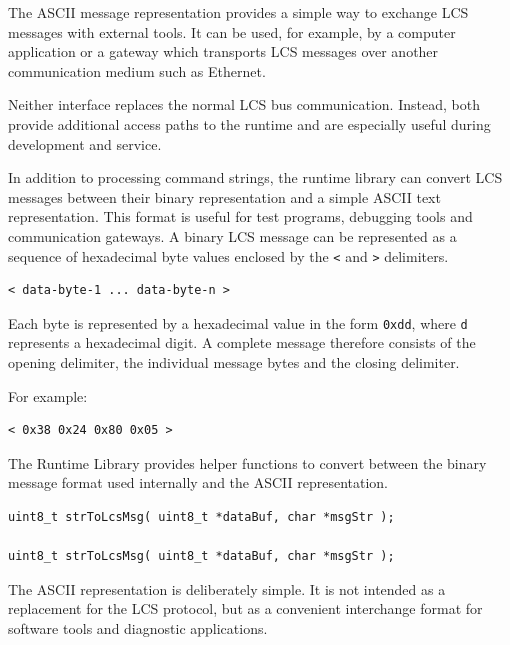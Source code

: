 The ASCII message representation provides a simple way to exchange LCS messages with
external tools. It can be used, for example, by a computer application or a gateway
which transports LCS messages over another communication medium such as Ethernet.

Neither interface replaces the normal LCS bus communication. Instead, both provide
additional access paths to the runtime and are especially useful during development and
service.



In addition to processing command strings, the runtime library can convert LCS messages
between their binary representation and a simple ASCII text representation.
This format is useful for test programs, debugging tools and communication gateways.
A binary LCS message can be represented as a sequence of hexadecimal byte values
enclosed by the \texttt{<} and \texttt{>} delimiters.

\lstset{style=codesnippet-nobox}
\begin{lstlisting}
< data-byte-1 ... data-byte-n >
\end{lstlisting}

Each byte is represented by a hexadecimal value in the form \texttt{0xdd}, where
\texttt{d} represents a hexadecimal digit. A complete message therefore consists of
the opening delimiter, the individual message bytes and the closing delimiter.

For example:

\lstset{style=codesnippet-nobox}
\begin{lstlisting}
< 0x38 0x24 0x80 0x05 >
\end{lstlisting}

The Runtime Library provides helper functions to convert between the binary message
format used internally and the ASCII representation.

\lstset{style=api-interface}
\begin{lstlisting}
uint8_t strToLcsMsg( uint8_t *dataBuf, char *msgStr );

uint8_t strToLcsMsg( uint8_t *dataBuf, char *msgStr ); 
\end{lstlisting}

The ASCII representation is deliberately simple. It is not intended as a replacement
for the LCS protocol, but as a convenient interchange format for software tools and
diagnostic applications.

